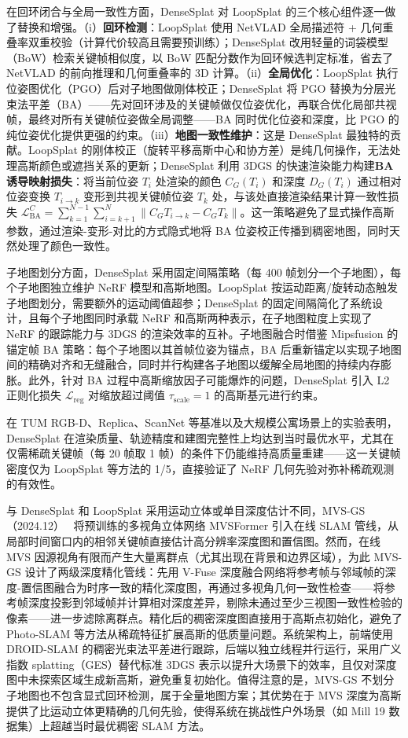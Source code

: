 在回环闭合与全局一致性方面，DenseSplat 对 LoopSplat 的三个核心组件逐一做了替换和增强。（i）\textbf{回环检测}：LoopSplat 使用 NetVLAD 全局描述符 + 几何重叠率双重校验（计算代价较高且需要预训练）；DenseSplat 改用轻量的词袋模型（BoW）检索关键帧相似度，以 BoW 匹配分数作为回环候选判定标准，省去了 NetVLAD 的前向推理和几何重叠率的 3D 计算。（ii）\textbf{全局优化}：LoopSplat 执行位姿图优化（PGO）后对子地图做刚体校正；DenseSplat 将 PGO 替换为分层光束法平差（BA）——先对回环涉及的关键帧做仅位姿优化，再联合优化局部共视帧，最终对所有关键帧位姿做全局调整——BA 同时优化位姿和深度，比 PGO 的纯位姿优化提供更强的约束。（iii）\textbf{地图一致性维护}：这是 DenseSplat 最独特的贡献。LoopSplat 的刚体校正（旋转平移高斯中心和协方差）是纯几何操作，无法处理高斯颜色或遮挡关系的更新；DenseSplat 利用 3DGS 的快速渲染能力构建\textbf{BA 诱导映射损失}：将当前位姿 $T_i$ 处渲染的颜色 $C_G(T_i)$ 和深度 $D_G(T_i)$ 通过相对位姿变换 $T_{i \to k}$ 变形到共视关键帧位姿 $T_k$ 处，与该处直接渲染结果计算一致性损失 $\mathcal{L}_{\mathrm{BA}}^C = \sum_{k=1}^{N-1}\sum_{i=k+1}^{N}\|C_G T_{i \to k} - C_G T_k\|$。这一策略避免了显式操作高斯参数，通过渲染-变形-对比的方式隐式地将 BA 位姿校正传播到稠密地图，同时天然处理了颜色一致性。

子地图划分方面，DenseSplat 采用固定间隔策略（每 400 帧划分一个子地图），每个子地图独立维护 NeRF 模型和高斯地图。LoopSplat 按运动距离/旋转动态触发子地图划分，需要额外的运动阈值超参；DenseSplat 的固定间隔简化了系统设计，且每个子地图同时承载 NeRF 和高斯两种表示，在子地图粒度上实现了 NeRF 的跟踪能力与 3DGS 的渲染效率的互补。子地图融合时借鉴 Mipsfusion 的锚定帧 BA 策略：每个子地图以其首帧位姿为锚点，BA 后重新锚定以实现子地图间的精确对齐和无缝融合，同时并行构建各子地图以缓解全局地图的持续内存膨胀。此外，针对 BA 过程中高斯缩放因子可能爆炸的问题，DenseSplat 引入 L2 正则化损失 $\mathcal{L}_{\mathrm{reg}}$ 对缩放超过阈值 $\tau_{\mathrm{scale}} = 1$ 的高斯基元进行约束。

在 TUM RGB-D、Replica、ScanNet 等基准以及大规模公寓场景上的实验表明，DenseSplat 在渲染质量、轨迹精度和建图完整性上均达到当时最优水平，尤其在仅需稀疏关键帧（每 20 帧取 1 帧）的条件下仍能维持高质量重建——这一关键帧密度仅为 LoopSplat 等方法的 1/5，直接验证了 NeRF 几何先验对弥补稀疏观测的有效性。

与 DenseSplat 和 LoopSplat 采用运动立体或单目深度估计不同，MVS-GS（2024.12）~\cite{2412_19130} 将预训练的多视角立体网络 MVSFormer 引入在线 SLAM 管线，从局部时间窗口内的相邻关键帧直接估计高分辨率深度图和置信图。然而，在线 MVS 因源视角有限而产生大量离群点（尤其出现在背景和边界区域），为此 MVS-GS 设计了两级深度精化管线：先用 V-Fuse 深度融合网络将参考帧与邻域帧的深度-置信图融合为时序一致的精化深度图，再通过多视角几何一致性检查——将参考帧深度投影到邻域帧并计算相对深度差异，剔除未通过至少三视图一致性检验的像素——进一步滤除离群点。精化后的稠密深度图直接用于高斯点初始化，避免了 Photo-SLAM 等方法从稀疏特征扩展高斯的低质量问题。系统架构上，前端使用 DROID-SLAM 的稠密光束法平差进行跟踪，后端以独立线程并行运行，采用广义指数 splatting（GES）替代标准 3DGS 表示以提升大场景下的效率，且仅对深度图中未探索区域生成新高斯，避免重复初始化。值得注意的是，MVS-GS 不划分子地图也不包含显式回环检测，属于全量地图方案；其优势在于 MVS 深度为高斯提供了比运动立体更精确的几何先验，使得系统在挑战性户外场景（如 Mill 19 数据集）上超越当时最优稠密 SLAM 方法。

